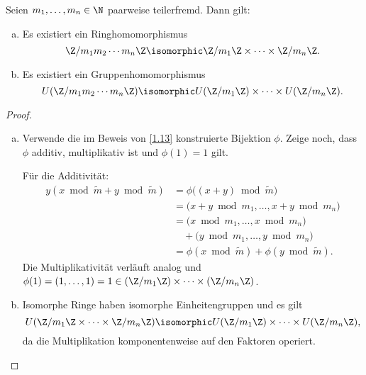 \begin{st} \label{1.14}
	Seien $m_1, \dotsc, m_n \in \N$ paarweise teilerfremd.
	Dann gilt:
	\begin{enumerate}[a)]
		\item
			Es existiert ein Ringhomomorphismus
			\[
				\Z / m_1m_2 \dotsb m_n \Z
				\isomorphic
				\Z /m_1 \Z \times \dotsb \times \Z / m_n \Z.
			\]
		\item
			Es existiert ein Gruppenhomomorphismus
			\[
				U(\Z / m_1 m_2 \dotsb m_n \Z)
				\isomorphic
				U(\Z / m_1 \Z) \times \dotsb \times U(\Z / m_n \Z).
			\]
	\end{enumerate}
	\begin{proof}
		\begin{enumerate}[a)]
			\item
				Verwende die im Beweis von \ref{1.13} konstruierte Bijektion $\phi$.
				Zeige noch, dass $\phi$ additiv, multiplikativ ist und $\phi(1) = 1$ gilt.

				Für die Additivität:
				\begin{align*}
					y(x \bmod \tilde m + y \bmod \tilde m)
					&= \phi\big( (x+y) \bmod \tilde m \big) \\
					&= \big(x + y \bmod m_1, \dotsc, x + y \bmod m_n \big) \\
					&= \big( x \bmod m_1, \dotsc, x \bmod m_n\big) \\
					&\quad + \big(y \bmod m_1, \dotsc, y \bmod m_n \big) \\
					&= \phi(x \bmod \tilde m) + \phi(y \bmod \tilde m).
				\end{align*}
				Die Multiplikativität verläuft analog und $\phi(1) = (1, \dotsc, 1) = 1 \in (\Z / m_1 \Z) \times \dotsb \times (\Z / m_n \Z)$.
			\item
				Isomorphe Ringe haben isomorphe Einheitengruppen und es gilt
				\[
					U(\Z / m_1 \Z \times \dotsb \times \Z / m_n \Z)
					\isomorphic U(\Z / m_1 \Z) \times \dotsb \times U(\Z / m_n \Z),
				\]
				da die Multiplikation komponentenweise auf den Faktoren operiert.
		\end{enumerate}
	\end{proof}
\end{st}

